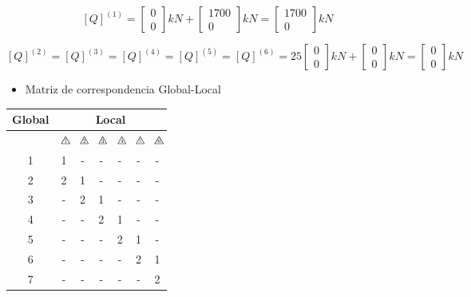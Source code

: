 \documentclass{article} %
\newcommand{\trinum}[1]{%
	\triangle\hspace{-.57em}\raisebox{0.1em}{\scalebox{.5}{#1}}
}
\begin{document}
\begin{equation}\label{}
[Q]^{(1)}=
\begin{bmatrix}
0\\
0
\end{bmatrix}kN+\begin{bmatrix}
1700\\
0
\end{bmatrix}kN=\begin{bmatrix}
1700\\
0
\end{bmatrix}kN
\end{equation}


\begin{equation}\label{}
[Q]^{(2)}=[Q]^{(3)}=[Q]^{(4)}=[Q]^{(5)}=[Q]^{(6)}=25 
\begin{bmatrix}
0\\
0
\end{bmatrix}kN+\begin{bmatrix}
0\\
0
\end{bmatrix}kN=\begin{bmatrix}
0\\
0
\end{bmatrix}kN
\end{equation}



\begin{itemize}
	\item Matriz de correspondencia Global-Local
\end{itemize}


\begin{table}[H]
	\centering
	\begin{tabular}{@{}ccccccc@{}}
		\toprule
		Global & \multicolumn{6}{c}{Local} \\ \midrule
		&$\trinum{1}$ & $\trinum{2}$ & $\trinum{3}$ & $\trinum{4}$ & $\trinum{5}$ & $\trinum{6}$ \\ \midrule
		1 & 1 & - & - & - & - & - \\
		2 & 2 & 1 & - & - & - & - \\
		3 & - & 2 & 1 & - & - & - \\
		4 & - & - & 2 & 1 & - & - \\
		5 & - & - & - & 2 & 1 & - \\
		6 & - & - & - & - & 2 & 1 \\
		7 & - & - & - & - & - & 2 \\ \bottomrule
	\end{tabular}
\end{table}
\end{document}
